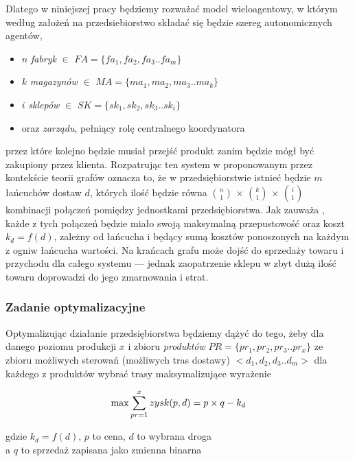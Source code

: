 \documentclass[polish, twoside, 12pt, a4paper]{article}
\theoremstyle{definition}
\theoremstyle{plain}
\theoremstyle{remark}
\begin{document}
 Dlatego w niniejszej pracy będziemy rozważać model wieloagentowy, w którym według założeń na przedsiebiorstwo składać się będzie szereg autonomicznych agentów,
	\begin{itemize} 
		\item $n$ \textit{fabryk} $\in$ $FA = \{fa_1,fa_2,fa_3..fa_m\} $ 
		\item $k$ \textit{magazynów} $\in$ $MA = \{ma_1,ma_2,ma_3..ma_k\} $ 
		\item $i$ \textit{sklepów} $\in$ $SK = \{sk_1,sk_2,sk_3..sk_i\} $
		\item oraz \textit{zarządu}, pełniący rolę centralnego koordynatora
	\end{itemize}

przez które kolejno będzie musiał przejść produkt zanim będzie mógł być zakupiony przez klienta. Rozpatrując ten system w proponowanym przez \cite{Kawa2010} kontekście teorii grafów oznacza to, że w przedsiębiorstwie istnieć będzie $m$ łańcuchów dostaw $d$, których ilość będzie równa  $n\choose 1 $ $ \times $ $k\choose 1 $ $ \times $ $i\choose 1 $ kombinacji połączeń pomiędzy jednostkami przedsiębiorstwa. Jak zauważa \cite{Kawa2010}, każde z tych połączeń będzie miało swoją maksymalną przepustowość oraz koszt $k_d = f(d)$, zależny od łańcucha i będący sumą kosztów ponoszonych na każdym z ogniw łańcucha wartości. Na krańcach grafu może dojść do sprzedaży towaru i przychodu dla całego systemu --- jednak zaopatrzenie sklepu w zbyt dużą ilość towaru doprowadzi do jego zmarnowania i strat. 

\subsubsection{Zadanie optymalizacyjne} 
Optymalizując działanie przedsiębiorstwa będziemy dążyć do tego, żeby dla danego poziomu produkcji $x$ i zbioru \textit{produktów} $PR = \{pr_1,pr_2,pr_3..pr_x\} $ ze zbioru możliwych sterowań (możliwych tras dostawy) $<d_1,d_2,d_3..d_m>$ dla każdego z produktów wybrać trasy maksymalizujące wyrażenie

\begin{equation} \label{eq:teoria1}
\max \sum\limits_{pr=1}^x  zysk (p,d) = p \times q - k_d \\
\end{equation}

\begin{center}
 gdzie $k_d = f(d)$, $p$ to cena, $d$ to wybrana droga \\
 a $q$ to sprzedaż zapisana jako zmienna binarna
\end{center}
\end{document}
